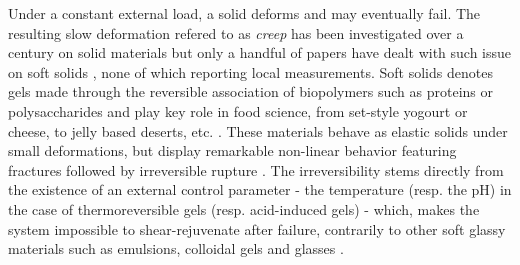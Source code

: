 \documentclass[twocolumn,superscriptaddress,showpacs,preprintnumbers,amsmath,amssymb,prl]{revtex4}
\begin{document}


Under a constant external load, a solid deforms and may eventually fail. The resulting slow deformation refered to as {\it creep} has been investigated over a century on solid materials \cite{Andrade:1910,Nechad:2005,Miguel:2002} but only a handful of papers have dealt with such issue on soft solids \cite{Higgs:1990,vanVliet:1995}, none of which reporting local measurements. Soft solids denotes gels made through the reversible association of biopolymers such as proteins or polysaccharides and play key role in food science, from set-style yogourt or cheese, to jelly based deserts, etc. \cite{Mezzenga:2005}.
These materials behave as elastic solids under small deformations, but display remarkable non-linear behavior featuring fractures followed by irreversible rupture \cite{Bonn:1998,Baumberger:2006,Daniels:2007,Brenner:2013}. The irreversibility stems directly  from the existence of an external control parameter - the temperature (resp. the pH) in the case of thermoreversible gels (resp. acid-induced gels) - which, makes the system impossible to shear-rejuvenate after failure, contrarily to other soft glassy materials such as emulsions, colloidal gels and glasses \cite{Cloitre:2000}.
\end{document}
